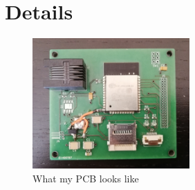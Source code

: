 \documentclass[a4paper,twoside, 12pt]{report}
\theoremstyle{break}
\begin{document}
\section{Details}
\begin{figure}[!ht]
  \centering
  \includegraphics[width=6cm]{SEM.jpg}
  \qquad
  \caption{What my PCB looks like}
\end{figure}
\end{document}
